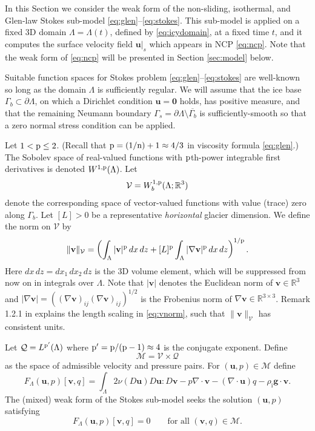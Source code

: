 \documentclass[hidelinks,onefignum,onetabnum,final]{siamart220329}  %
\newcommand{\RR}{\mathbb{R}}
\newcommand{\grad}{\nabla}
\newcommand{\Div}{\nabla\cdot}
\newcommand{\bg}{\mathbf{g}}
\newcommand{\bu}{\mathbf{u}}
\newcommand{\bv}{\mathbf{v}}
\newcommand{\bzero}{\bm{0}}
\newcommand{\cQ}{\mathcal{Q}}
\newcommand{\cV}{\mathcal{V}}
\newcommand{\nn}{{\text{\textnormal{n}}}}
\newcommand{\pp}{{\text{\textnormal{p}}}}
\newcommand{\rhoi}{\rho_{\text{i}}}
\begin{document}
In this Section we consider the weak form of the non-sliding, isothermal, and Glen-law Stokes sub-model \eqref{eq:glen}--\eqref{eq:stokes}.  This sub-model is applied on a fixed 3D domain $\Lambda = \Lambda(t)$, defined by \eqref{eq:icydomain}, at a fixed time $t$, and it computes the surface velocity field $\bu|_s$ which appears in NCP \eqref{eq:ncp}.  Note that the weak form of \eqref{eq:ncp} will be presented in Section \ref{sec:model} below.

Suitable function spaces for Stokes problem \eqref{eq:glen}--\eqref{eq:stokes} are well-known so long as the domain $\Lambda$ is sufficiently regular.  We will assume that the ice base $\Gamma_b\subset\partial \Lambda$, on which a Dirichlet condition $\bu=\bzero$ holds, has positive measure, and that the remaining Neumann boundary $\Gamma_s = \partial \Lambda \setminus \overline{\Gamma_b}$ is sufficiently-smooth so that a zero normal stress condition can be applied.

Let $1 < \pp \le 2$.  (Recall that $\pp=(1/\nn)+1\approx 4/3$ in viscosity formula \eqref{eq:glen}.)  The Sobolev space \cite{Evans2010} of real-valued functions with $\pp$th-power integrable first derivatives is denoted $W^{1,\pp}(\Lambda)$.  Let
\begin{equation}
\cV = W_b^{1,\pp}(\Lambda; \RR^3) \label{eq:defineV}
\end{equation}
denote the corresponding space of vector-valued functions with value (trace) zero along $\Gamma_b$.  Let $[L]>0$ be a representative \emph{horizontal} glacier dimension.  We define the norm on $\cV$ by
\begin{equation}
\|\bv\|_{\cV} = \left(\int_\Lambda |\bv|^\pp\,dx\,dz + [L]^\pp \int_\Lambda |\grad\bv|^\pp\,dx\,dz\right)^{1/\pp}. \label{eq:vnorm}
\end{equation}
Here $dx\,dz = dx_1\,dx_2\,dz$ is the 3D volume element, which will be suppressed from now on in integrals over $\Lambda$.  Note that $|\bv|$ denotes the Euclidean norm of $\bv\in\RR^3$ and $|\grad\bv|=\left((\grad\bv)_{ij} (\grad\bv)_{ij}\right)^{1/2}$ is the Frobenius norm of $\grad\bv\in\RR^{3\times 3}$.  Remark 1.2.1 in \cite{BoffiBrezziFortin2013} explains the length scaling in \eqref{eq:vnorm}, such that $\|\bv\|_{\cV}$ has consistent units.

Let $\cQ=L^{\pp'}(\Lambda)$ where $\pp'=\pp/(\pp-1)\approx 4$ is the conjugate exponent.  Define
\begin{equation}
\mathcal{M} = \cV \times \cQ \label{eq:glenstokes:mixedspace}
\end{equation}
as the space of admissible velocity and pressure pairs.  For $(\bu,p) \in \mathcal{M}$ define
\begin{equation}
F_\Lambda(\bu,p)[\bv,q] = \int_\Lambda 2 \nu(D\bu) D\bu : D\bv - p \Div\bv - (\Div\bu) q - \rhoi \bg \cdot \bv. \label{eq:glenstokes:fcnl}
\end{equation}
The (mixed) weak form of the Stokes sub-model seeks the solution $(\bu,p)$ satisfying
\begin{equation}
F_\Lambda(\bu,p)[\bv,q] = 0 \qquad \text{for all } (\bv,q) \in \mathcal{M}. \label{eq:glenstokes:weak}
\end{equation}
\end{document}
